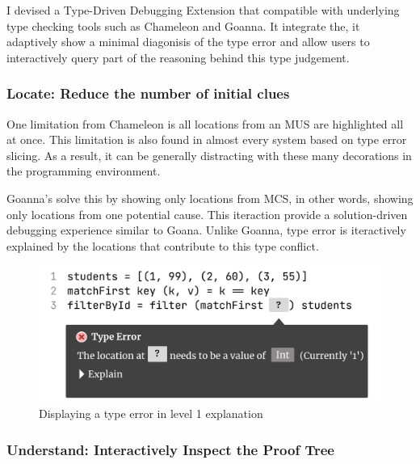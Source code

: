 I devised a Type-Driven Debugging Extension that compatible with underlying type checking tools such as Chameleon and Goanna.  It integrate the, it adaptively show a minimal diagonisis of the type error and allow users to interactively query part of the reasoning behind this type judgement.  


\subsubsection{Locate: Reduce the number of initial clues}

One limitation from Chameleon is all locations from an MUS are highlighted all at once. This limitation is also found in almost every system based on type error slicing.   As a result, it can be generally distracting with these many decorations in the programming environment. 

Goanna's solve this by  showing only locations from MCS, in other words, showing only locations from one potential cause. 
This iteraction provide a  solution-driven debugging experience similar to Goana. Unlike Goanna, type error is iteractively explained by the locations that contribute to this type conflict.

\begin{figure}[hbt]
    \includegraphics[width=\linewidth]{Debugging-1}
    \caption{
        Displaying a type error in level 1 explanation
      }
  \end{figure}


\subsubsection{Understand: Interactively Inspect the Proof Tree}

